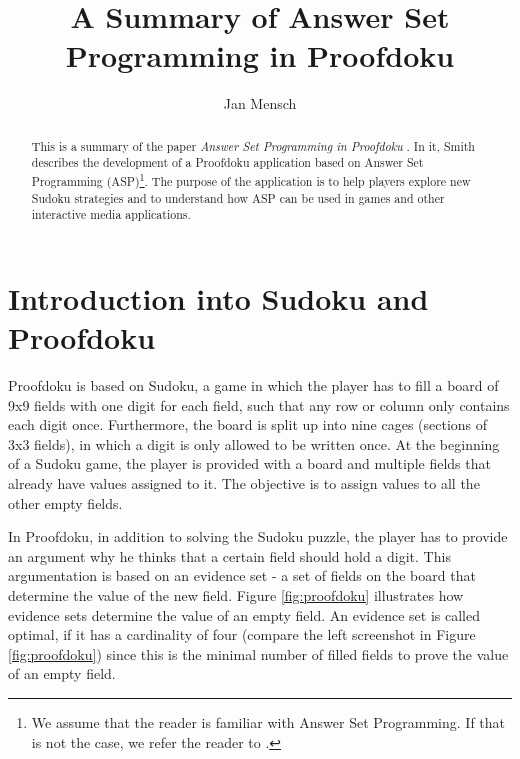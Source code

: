 \documentclass[runningheads]{llncs}
\newcommand{\papertitle}{Answer Set Programming in Proofdoku}
\newcommand{\authorquote}{Smith}
\begin{document}
\title{A Summary of \papertitle}

\author{Jan Mensch}




%
\maketitle              %
%
\begin{abstract}
This is a summary of the paper \textit{\papertitle} \cite{nogueira2001prolog}. In it, \authorquote{} describes the development of a Proofdoku application based on Answer Set Programming (ASP)\footnote{We assume that the reader is familiar with Answer Set Programming. If that is not the case, we refer the reader to \cite{erdem2016applications}.}. The purpose of the application is to help players explore new Sudoku strategies and to understand how ASP can be used in games and other interactive media applications.
\end{abstract}


\section{Introduction into Sudoku and Proofdoku} \label{sec:concept}

Proofdoku is based on Sudoku, a game in which the player has to fill a board of 9x9 fields with one digit for each field, such that any row or column only contains each digit once. Furthermore, the board is split up into nine cages (sections of 3x3 fields), in which a digit is only allowed to be written once. At the beginning of a Sudoku game, the player is provided with a board and multiple fields that already have values assigned to it. The objective is to assign values to all the other empty fields. 

In Proofdoku, in addition to solving the Sudoku puzzle, the player has to provide an argument why he thinks that a certain field should hold a digit. This argumentation is based on an evidence set - a set of fields on the board that determine the value of the new field. Figure \ref{fig:proofdoku} illustrates how evidence sets determine the value of an empty field. An evidence set is called optimal, if it has a cardinality of four (compare the left screenshot in Figure \ref{fig:proofdoku}) since this is the minimal number of filled fields to prove the value of an empty field. 
\end{document}
